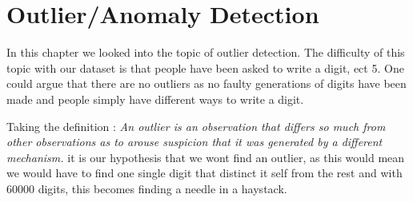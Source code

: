 \chapter{Outlier/Anomaly Detection}

In this chapter we looked into the topic of outlier detection. The difficulty of this topic with our dataset is that people have been asked to write a digit, ect 5. One could argue that there are no outliers as no faulty generations of digits have been made and people simply have different ways to write a digit. 

Taking the definition : \textit{An outlier is an observation that differs so much from other observations as to arouse suspicion that it was generated by a different mechanism.} it is our hypothesis that we wont find an outlier, as this would mean we would have to find one single digit that distinct it self from the rest and with 60000 digits, this becomes finding a needle in a haystack.

  
